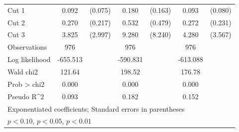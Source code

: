 \begin{table}[htbp]
\begin{tabular}{l*{3}{cc}}
Cut 1               &       0.092\sym{***}&     (0.075)&       0.180\sym{*}  &     (0.163)&       0.093\sym{***}&     (0.080)\\
Cut 2               &       0.270         &     (0.217)&       0.532         &     (0.479)&       0.272         &     (0.231)\\
Cut 3               &       3.825\sym{*}  &     (2.997)&       9.280\sym{**} &     (8.240)&       4.280\sym{*}  &     (3.567)\\
\hline
Observations        &         976         &            &         976         &            &         976         &            \\
Log likelihood      &    -655.513         &            &    -590.831         &            &    -613.088         &            \\
Wald chi2           &      121.64         &            &      198.52         &            &      176.78         &            \\
Prob > chi2         &       0.000         &            &       0.000         &            &       0.000         &            \\
Pseudo R^2          &       0.093         &            &       0.182         &            &       0.152         &            \\
\hline\hline
\multicolumn{7}{l}{\footnotesize Exponentiated coefficients; Standard errors in parentheses}\\
\multicolumn{7}{l}{\footnotesize \sym{*} \(p<0.10\), \sym{**} \(p<0.05\), \sym{***} \(p<0.01\)}\\
\end{tabular}
\end{table}

